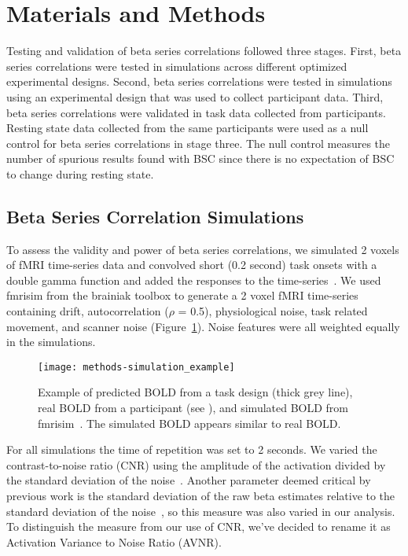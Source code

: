 \documentclass[phd,figures,tables,ackpage,abstractpage,publicabstractpage]{uithesis}
\begin{document}
\section{Materials and Methods}
\label{methods}

Testing and validation of beta series correlations followed three stages.
First, beta series correlations were tested in simulations across different
optimized experimental designs.
Second, beta series correlations were tested in simulations using an experimental
design that was used to collect participant data.
Third, beta series correlations were validated in task data collected from
participants.
Resting state data collected from the same participants were used as a null
control for beta series correlations in stage three.
The null control measures the number of spurious results found
with BSC since there is no expectation of BSC to change
during resting state.

\subsection{Beta Series Correlation Simulations}
\label{methods:bsc-simulations}

To assess the validity and power of beta series correlations,
we simulated 2 voxels of fMRI time-series data and convolved short (0.2 second)
task onsets with a double gamma function
and added the responses to the time-series~\cite{Glover1999,Welvaert2011}.
We used fmrisim from the brainiak toolbox\cite{Ellis2020} to generate a
2 voxel fMRI time-series containing drift, autocorrelation ($\rho$ = 0.5), physiological noise,
task related movement, and scanner noise (Figure~\ref{fig:simulation_example}).
Noise features were all weighted equally in the simulations.

\begin{figure}[H]
  \centering
  \texttt{[image: methods-simulation\_example]}
  \caption[Illustration of simulated data]{
    Example of predicted BOLD from a task design (thick grey line), real BOLD
    from a participant (see ), and simulated BOLD
    from fmrisim~\cite{Ellis2020}.
    The simulated BOLD appears similar to real BOLD.
  }
  \label{fig:simulation_example}
\end{figure}

For all simulations the time of repetition was set to 2 seconds.
We varied the contrast-to-noise ratio (CNR) using the amplitude of the activation
divided by the standard deviation of the noise~\cite{Welvaert2013a}.
Another parameter deemed critical by previous work is the standard deviation
of the raw beta estimates relative to the standard deviation of the noise~\cite{Abdulrahman2016},
so this measure was also varied in our analysis.
To distinguish the measure from our use of CNR,
we've decided to rename it as Activation Variance to Noise Ratio (AVNR).
\end{document}
